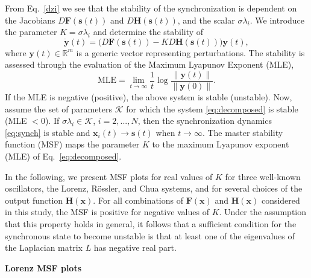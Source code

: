 \documentclass[%
 reprint,
 amsmath,amssymb,
 aip,
]{revtex4-2}
\def \bF {\pmb{F}}
\def \bH {\pmb{H}}
\def \bx {\pmb{x}}
\def \by {\pmb{y}}
\def \bs {\pmb{s}}
\theoremstyle{italichead}
\theoremstyle{definition}
\begin{document}
{From Eq.\ \eqref{dzi} we see that the stability of the synchronization is dependent on the Jacobians $D\bF(\bs(t))$ and $D\bH(\bs(t))$, and the scalar $\sigma \lambda_i$.
We introduce the parameter $K = \sigma \lambda_i$ and determine the stability of
\begin{equation} \label{eq:decomposed}
    \dot{\by} (t) = \Bigg(D\bF(\bs(t)) - K D\bH(\bs (t)) \Bigg) \by (t),
\end{equation}
where $\by (t) \in \mathbb{R}^m$ is a generic vector representing perturbations.
The stability is assessed through the evaluation of the Maximum Lyapunov Exponent (MLE),
\begin{equation}
    \text{MLE} = \lim_{t\to \infty} \dfrac{1}{t} \log \dfrac{\| \by(t) \|}{\| \by (0) \|}.
\end{equation}
If the MLE is negative (positive), the above system is stable (unstable).
Now, assume the set of parameters $\mathcal{K}$ for which the system \eqref{eq:decomposed} is stable (MLE $<0$).
If $\sigma \lambda_i \in \mathcal{K}$, $i=2,...,N$, then the synchronization dynamics \eqref{eq:synch} is stable and $\bx_i (t) \to \bs(t)$ when $t \to \infty$.
The master stability function (MSF) maps the parameter $K$ to the maximum Lyapunov exponent (MLE) of Eq.~\eqref{eq:decomposed}.

In the following, we present MSF plots for real values of $K$ for three well-known oscillators, the Lorenz, R\"ossler, and Chua systems, and for several choices of the output function $\mathbf{H}(\mathbf{x})$. For all combinations of $\mathbf{F}(\mathbf{x})$ and $\mathbf{H}(\mathbf{x})$ considered in this study, the MSF is positive for negative values of $K$. Under the assumption that this property holds in general, it follows that  a sufficient condition for the synchronous state to become unstable is that at least one of the eigenvalues of the Laplacian matrix $L$ has negative real part.

\textbf{Lorenz MSF plots}

}
\end{document}
